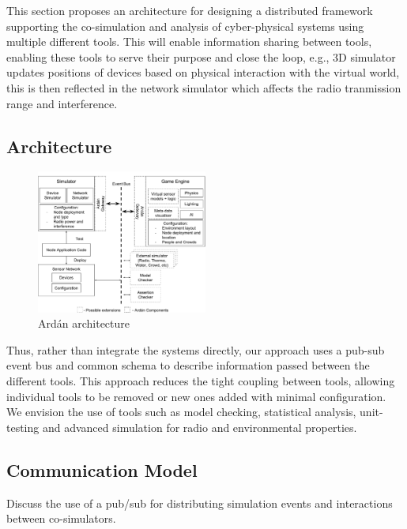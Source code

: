 This section proposes an architecture for designing a distributed framework supporting the co-simulation and analysis of cyber-physical systems using multiple different tools.
This will enable information sharing between tools, enabling these tools to serve their purpose and close the loop, e.g., 3D simulator updates positions of devices based on physical interaction with the virtual world, this is then reflected in the network simulator which affects the radio tranmission range and interference.



\subsection{Architecture} %
\label{sub:architecture}

\begin{figure}[ht]
\centering
  \includegraphics[width=0.5\textwidth]{./imgs/architecture}
  \caption{Ard\'{a}n architecture}
  \label{fig:architecture}
\end{figure}


Thus, rather than integrate the systems directly, our approach uses a pub-sub event bus and common schema to describe information passed between the different tools. This approach reduces the tight coupling between tools, allowing individual tools to be removed or new ones added with minimal configuration. We envision the use of tools such as model checking, statistical analysis, unit-testing and advanced simulation for radio and environmental properties.


\subsection{Communication Model} %
\label{sub:communication_model}

Discuss the use of a pub/sub for distributing simulation events and interactions between co-simulators.

